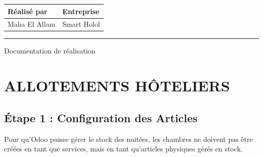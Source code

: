 \documentclass[11pt,a4paper]{report}
\begin{document}
\begin{titlepage}
\begin{center}
        \renewcommand{\arraystretch}{1.7}

        \begin{tabular}{>{\centering\arraybackslash}p{5.5cm}
                        >{\centering\arraybackslash}p{5.5cm}}

            \textbf{\color{darkblue}Réalisé par}
            &
            \textbf{\color{darkblue}Entreprise}
            \\[0.15cm]

            \hline

            Maha El Allam
            &
            Smart Holol

        \end{tabular}

        \vfill

        {\color{mainblue}\rule{\textwidth}{0.6pt}}

        \vspace{0.4cm}

        {\large
        Documentation de réalisation
        }

        \vspace{0.2cm}

    \end{center}

\end{titlepage}


\cleardoublepage
{}
\vspace{0.8cm}
\tableofcontents
\cleardoublepage


\chapter{ALLOTEMENTS HÔTELIERS}

\section{Étape 1 : Configuration des Articles}

Pour qu'Odoo puisse gérer le stock des nuitées, les chambres ne doivent pas être créées en tant que services, mais en tant qu'articles physiques gérés en stock.
\end{document}
